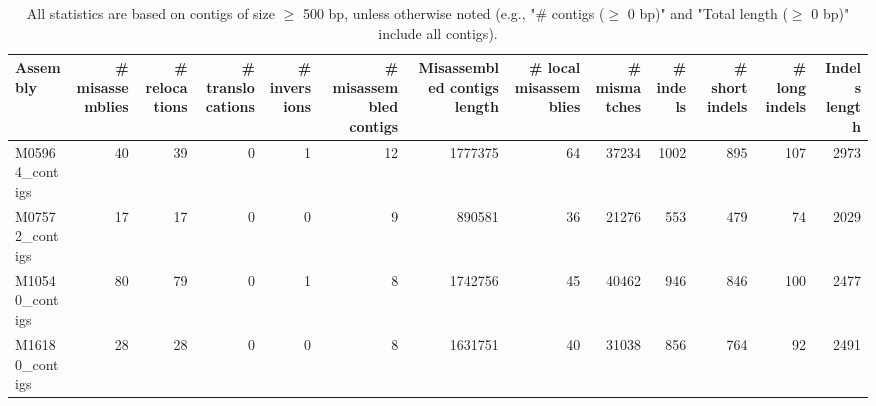 \documentclass[12pt,a4paper]{article}
\begin{document}
\begin{table}[ht]
\begin{center}
\caption{All statistics are based on contigs of size $\geq$ 500 bp, unless otherwise noted (e.g., "\# contigs ($\geq$ 0 bp)" and "Total length ($\geq$ 0 bp)" include all contigs).}
\begin{tabular}{|l*{12}{|r}|}
\hline
Assembly & \# misassemblies &     \# relocations &     \# translocations &     \# inversions & \# misassembled contigs & Misassembled contigs length & \# local misassemblies & \# mismatches & \# indels &     \# short indels &     \# long indels & Indels length \\ \hline
M05964\_contigs & 40 & 39 & 0 & 1 & 12 & 1777375 & 64 & 37234 & 1002 & 895 & 107 & 2973 \\ \hline
M07572\_contigs & 17 & 17 & 0 & 0 & 9 & 890581 & 36 & 21276 & 553 & 479 & 74 & 2029 \\ \hline
M10540\_contigs & 80 & 79 & 0 & 1 & 8 & 1742756 & 45 & 40462 & 946 & 846 & 100 & 2477 \\ \hline
M16180\_contigs & 28 & 28 & 0 & 0 & 8 & 1631751 & 40 & 31038 & 856 & 764 & 92 & 2491 \\ \hline
\end{tabular}
\end{center}
\end{table}
\end{document}
